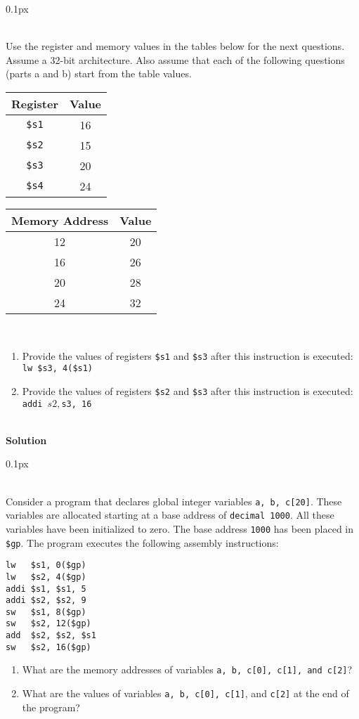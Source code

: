 \documentclass[11pt]{article}
\newcommand{\problem}[1]{\begin{adjustwidth}{0.1px}\noindent \framebox[1.2\width]{\large Problem #1}\end{adjustwidth} \bigskip\\}
\newcommand{\code}[1]{{\texttt{#1}}}
\begin{document}
\newpage
\problem{8}
Use the register and memory values in the tables below for the next questions. Assume a 32-bit architecture. Also assume that each of the following questions (parts a and b) start from the table values.
\\
\begin{center}

\begin{tabular}{ |c|c| } 
\hline
Register & Value\\
\hline
\code{\$s1} & 16\\ 
\code{\$s2} & 15\\
\code{\$s3} & 20\\ 
\code{\$s4} & 24\\ 
\hline
\end{tabular}
\hspace{1cm}
\begin{tabular}{ |c|c| } 
\hline
Memory Address & Value\\
\hline
12 & 20\\ 
16 & 26\\
20 & 28\\ 
24 & 32\\ 
\hline
\end{tabular}
\end{center}
\medskip\\
\begin{enumerate}[label=(\alph*)]
    \item Provide the values of registers \code{\$s1} and \code{\$s3} after this instruction is executed:\\
    \code{lw \$s3, 4(\$s1)}

    \item Provide the values of registers \code{\$s2} and \code{\$s3} after this instruction is executed:\\
    \code{addi $s2, $s3, 16} 
\end{enumerate}
\bigskip \\
\textbf{Solution}\\







\newpage
\problem{9}
Consider a program that declares global integer variables \code{a, b, c[20]}. These variables are allocated starting at a base address of \code{decimal 1000}. All these variables have been initialized to zero. The base address \code{1000} has been placed in \code{\$gp}. The program executes the following assembly instructions:
\begin{lstlisting}[style=MIPS]
lw   $s1, 0($gp)
lw   $s2, 4($gp)
addi $s1, $s1, 5
addi $s2, $s2, 9
sw   $s1, 8($gp)
sw   $s2, 12($gp)
add  $s2, $s2, $s1
sw   $s2, 16($gp)
\end{lstlisting}
\begin{enumerate}[label=(\alph*)]
    \item What are the memory addresses of variables \code{a, b, c[0], c[1], and c[2]}?
    \item What are the values of variables \code{a, b, c[0], c[1]}, and \code{c[2]} at the end of the program?
\end{enumerate}
\end{document}
